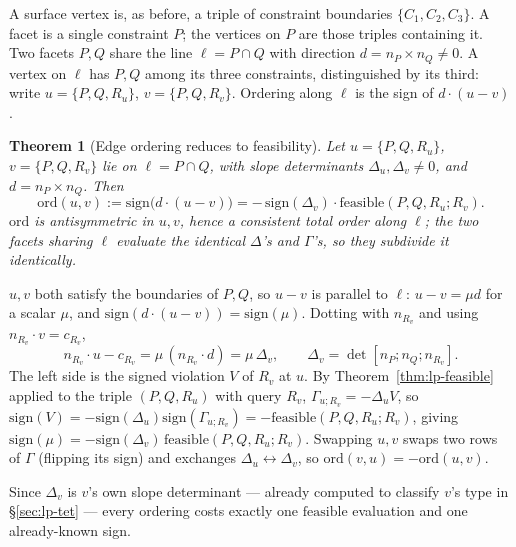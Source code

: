 \documentclass[12pt]{article}
\makeatletter
\newtheorem{theorem}{Theorem}
\theoremstyle{definition}
\theoremstyle{remark}
\renewenvironment{proof}[1][\proofname]{\par
  \pushQED{\qed}%
  \normalfont \footnotesize \topsep6\p@\@plus6\p@\relax
  \list{}{\leftmargin=2em
          \settowidth{\itemindent}{\itshape#1}%
          \labelwidth=\itemindent
          \parsep=0pt \listparindent=\parindent 
  }
  \item[\hskip\labelsep
        \itshape
    #1\@addpunct{.}]\ignorespaces
}{%
  \popQED\endlist\@endpefalse
}
\makeatother
\begin{document}
A surface vertex is, as before, a triple of constraint boundaries
$\{C_1,C_2,C_3\}$. A facet is a single constraint $P$; the vertices on $P$
are those triples containing it. Two facets $P,Q$ share the line
$\ell=P\cap Q$ with direction $d=n_P\times n_Q\neq0$. A vertex on $\ell$ has
$P,Q$ among its three constraints, distinguished by its third: write
$u=\{P,Q,R_u\}$, $v=\{P,Q,R_v\}$. Ordering along $\ell$ is the sign of
$d\cdot(u-v)$.

\begin{theorem}[Edge ordering reduces to feasibility]\label{thm:order}
Let $u=\{P,Q,R_u\}$, $v=\{P,Q,R_v\}$ lie on $\ell=P\cap Q$, with slope
determinants $\Delta_u,\Delta_v\neq0$, and $d=n_P\times n_Q$. Then
\begin{equation*}
    \mathrm{ord}(u,v) := \mathrm{sign}\big(d\cdot(u-v)\big) = -\,\mathrm{sign}(\Delta_v)\cdot\mathrm{feasible}(P,Q,R_u;R_v).
\end{equation*}
$\mathrm{ord}$ is antisymmetric in $u,v$, hence a consistent total order
along $\ell$; the two facets sharing $\ell$ evaluate the identical
$\Delta$'s and $\Gamma$'s, so they subdivide it identically.
\end{theorem}
\begin{proof}
$u,v$ both satisfy the boundaries of $P,Q$, so $u-v$ is parallel to $\ell$:
$u-v=\mu d$ for a scalar $\mu$, and $\mathrm{sign}(d\cdot(u-v))=
\mathrm{sign}(\mu)$. Dotting with $n_{R_v}$ and using $n_{R_v}\cdot
v=c_{R_v}$,
\begin{equation*}
    n_{R_v}\cdot u - c_{R_v} = \mu\,(n_{R_v}\cdot d) = \mu\,\Delta_v, \qquad \Delta_v = \det[n_P;n_Q;n_{R_v}].
\end{equation*}
The left side is the signed violation $V$ of $R_v$ at $u$. By
Theorem~\ref{thm:lp-feasible} applied to the triple $(P,Q,R_u)$ with query
$R_v$, $\Gamma_{u;R_v} = -\Delta_u V$, so $\mathrm{sign}(V) =
-\mathrm{sign}(\Delta_u)\mathrm{sign}(\Gamma_{u;R_v}) =
-\mathrm{feasible}(P,Q,R_u;R_v)$, giving $\mathrm{sign}(\mu) =
-\mathrm{sign}(\Delta_v)\,\mathrm{feasible}(P,Q,R_u;R_v)$. Swapping $u,v$
swaps two rows of $\Gamma$ (flipping its sign) and exchanges
$\Delta_u\leftrightarrow\Delta_v$, so $\mathrm{ord}(v,u)=-\mathrm{ord}(u,v)$.
\end{proof}

\noindent
Since $\Delta_v$ is $v$'s own slope determinant --- already computed to
classify $v$'s type in \S\ref{sec:lp-tet} --- every ordering costs exactly
one $\mathrm{feasible}$ evaluation and one already-known sign.
\end{document}
